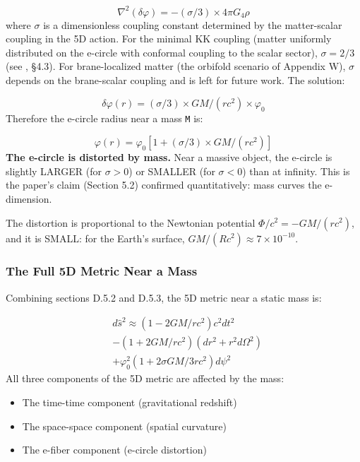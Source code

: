 \documentclass[aps,prd,preprint,superscriptaddress,longbibliography,floatfix]{revtex4-2}
\theoremstyle{remark}
\begin{document}
\begin{equation}
    \nabla^{2}(\delta\varphi) = -(\sigma/3) \times 4\pi G_{4}\rho
\end{equation}
where $\sigma$ is a dimensionless coupling constant determined by the matter-scalar coupling in the 5D action. For the minimal KK coupling (matter uniformly distributed on the e-circle with conformal coupling to the scalar sector), $\sigma = 2/3$ (see \cite{OverduinWesson1997}, \S{}4.3). For brane-localized matter (the orbifold scenario of Appendix W), $\sigma$ depends on the brane-scalar coupling and is left for future work. The solution:


\begin{equation}
    \delta\varphi(r) = (\sigma/3) \times GM/(rc^{2}) \times \varphi_{0}
\end{equation}
Therefore the e-circle radius near a mass \texttt{M} is:


\begin{equation}
    \varphi(r) = \varphi_{0} [1 + (\sigma/3) \times GM/(rc^{2})]
\end{equation}
\textbf{The e-circle is distorted by mass.} Near a massive object, the e-circle is slightly LARGER (for $\sigma > 0$) or SMALLER (for $\sigma < 0$) than at infinity. This is the paper's claim (Section 5.2) confirmed quantitatively: mass curves the e-dimension.

The distortion is proportional to the Newtonian potential $\Phi/c^{2} = -GM/(rc^{2})$, and it is SMALL: for the Earth's surface, $GM/(Rc^{2}) \approx 7 \times 10^{-10}$.


\subsubsection{The Full 5D Metric Near a Mass}

Combining sections D.5.2 and D.5.3, the 5D metric near a static mass is:


\begin{align}
    & d\hat{s}^{2} \approx (1 - 2GM/rc^{2}) c^{2}dt^{2} \\
    & - (1 + 2GM/rc^{2})(dr^{2} + r^{2}d\Omega^{2}) \\
    & + \varphi_{0}^{2}(1 + 2\sigma GM/3rc^{2}) d\psi^{2}
\end{align}
All three components of the 5D metric are affected by the mass:

\begin{itemize}
  \item The time-time component (gravitational redshift)
  \item The space-space component (spatial curvature)
  \item The e-fiber component (e-circle distortion)
\end{itemize}
\end{document}
